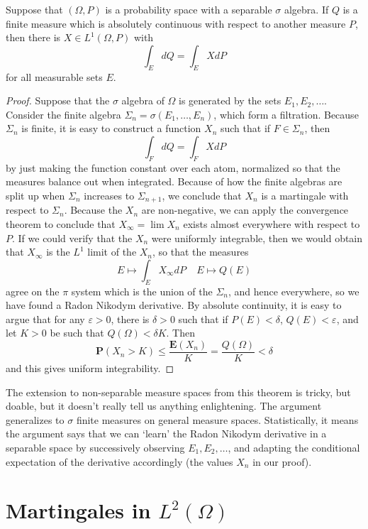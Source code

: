 \begin{theorem}
    Suppose that $(\Omega,P)$ is a probability space with a separable $\sigma$ algebra. If $Q$ is a finite measure which is absolutely continuous with respect to another measure $P$, then there is $X \in L^1(\Omega,P)$ with
    \[ \int_E dQ = \int_E X dP \]
    for all measurable sets $E$.
\end{theorem}
\begin{proof}
    Suppose that the $\sigma$ algebra of $\Omega$ is generated by the sets $E_1, E_2, \dots$. Consider the finite algebra $\Sigma_n = \sigma(E_1, \dots, E_n)$, which form a filtration. Because $\Sigma_n$ is finite, it is easy to construct a function $X_n$ such that if $F \in \Sigma_n$, then
    \[ \int_F dQ = \int_F X dP \]
    by just making the function constant over each atom, normalized so that the measures balance out when integrated. Because of how the finite algebras are split up when $\Sigma_n$ increases to $\Sigma_{n+1}$, we conclude that $X_n$ is a martingale with respect to $\Sigma_n$. Because the $X_n$ are non-negative, we can apply the convergence theorem to conclude that $X_\infty = \lim X_n$ exists almost everywhere with respect to $P$. If we could verify that the $X_n$ were uniformly integrable, then we would obtain that $X_\infty$ is the $L^1$ limit of the $X_n$, so that the measures
    \[ E \mapsto \int_E X_\infty dP\ \ \ \ \ E \mapsto Q(E) \]
    agree on the $\pi$ system which is the union of the $\Sigma_n$, and hence everywhere, so we have found a Radon Nikodym derivative. By absolute continuity, it is easy to argue that for any $\varepsilon > 0$, there is $\delta > 0$ such that if $P(E) < \delta$, $Q(E) < \varepsilon$, and let $K > 0$ be such that $Q(\Omega) < \delta K$. Then
    \[ \mathbf{P}(X_n > K) \leq \frac{\mathbf{E}(X_n)}{K} = \frac{Q(\Omega)}{K} < \delta \]
    and this gives uniform integrability.
\end{proof}

The extension to non-separable measure spaces from this theorem is tricky, but doable, but it doesn't really tell us anything enlightening. The argument generalizes to $\sigma$ finite measures on general measure spaces. Statistically, it means the argument says that we can `learn' the Radon Nikodym derivative in a separable space by successively observing $E_1, E_2, \dots$, and adapting the conditional expectation of the derivative accordingly (the values $X_n$ in our proof).

\section{Martingales in $L^2(\Omega)$}

